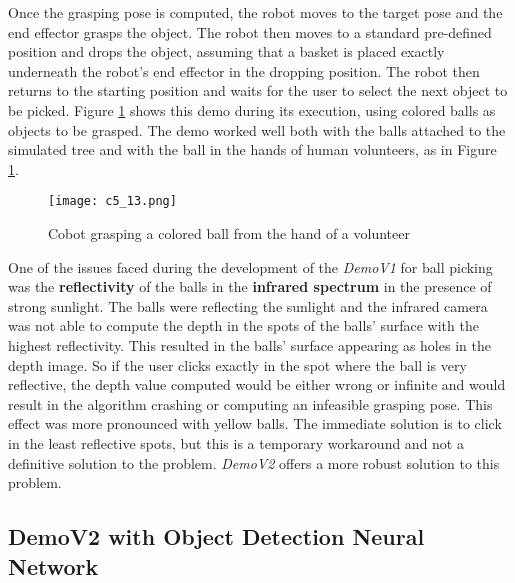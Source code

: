 Once the grasping pose is computed, the robot moves to the target pose and the end effector grasps the object.
The robot then moves to a standard pre-defined position and drops the object, assuming that a basket
is placed exactly underneath the robot's end effector in the dropping position. The robot then returns to the
starting position and waits for the user to select the next object to be picked. Figure \ref{fig:bp1}
shows this demo during its execution, using colored balls as objects to be grasped. The demo worked well
both with the balls attached to the simulated tree and with the ball in the hands of human volunteers, as
in Figure \ref{fig:bp1}.

\begin{figure}[t]
    \centering
    \texttt{[image: c5\_13.png]}
    \caption{Cobot grasping a colored ball from the hand of a volunteer}
    \label{fig:bp1}
\end{figure}

One of the issues faced during the development of the \textit{DemoV1} for ball picking was the \textbf{reflectivity} of the balls
in the \textbf{infrared spectrum} in the presence of strong sunlight. The balls were reflecting the sunlight and the infrared
camera was not able to compute the depth in the spots of the balls' surface with the highest reflectivity. This resulted
in the balls' surface appearing as holes in the depth image. So if the user clicks exactly in the spot where
the ball is very reflective, the depth value computed would be either wrong or infinite and would result in the
algorithm crashing or computing an infeasible grasping pose. This effect was more pronounced with yellow balls.
The immediate solution is to click in the least reflective spots, but this is a temporary workaround and 
not a definitive solution to the problem. \textit{DemoV2} offers a more robust solution to this problem.

\subsection{DemoV2 with Object Detection Neural Network}

